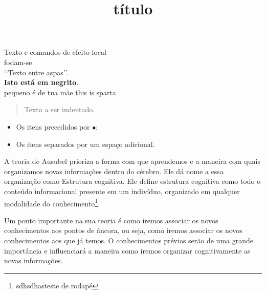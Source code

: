 \documentclass[12pt,twocolumn]{report}
\title{título}
\begin{document}
\maketitle{}
\tableofcontents
 Texto e comandos de efeito local\\
fodam-se\\
‘‘Texto entre aspas’’.\\
\textbf{Isto está em negrito}.\\
{\small pequeno é de tua mãe}
{\color{blue} this is sparta}
\begin{quote}
Texto a ser indentado.
\end{quote}
\begin{itemize}
\item Os itens  precedidos por $\bullet$;
\item Os itens  separados por um espaço adicional.
\end{itemize}

\indent A teoria de Ausubel prioriza a forma com que aprendemos e a maneira com quais
organizamos novas informações dentro do cérebro. Ele dá nome a essa organização como Estrutura
cognitiva. Ele define estrutura cognitiva como todo o conteúdo informacional presente em um
indivíduo, organizado em qualquer modalidade do conhecimento\footnote{sdhsdhasteste de rodapé}.

\indent Um ponto importante na sua teoria é como iremos associar os novos conhecimentos
aos pontos de âncora, ou seja, como iremos associar os novos conhecimentos aos que já temos. O
conhecimentos prévios serão de uma grande importância e influenciará a maneira como iremos
organizar cognitivamente as novas informações.
\end{document}
